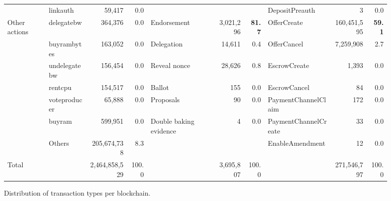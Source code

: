 \begin{figure*}[tbp]
\begin{tabular}{@{}lp{0.7in}rrp{1.2in}rrp{0.9in}rr@{}}
		                & linkauth                           & 59,417                             & 0.0                                 &                        &           &                            & DepositPreauth       & 3           & 0.0                        \\
		\cmidrule(r){1-1} \cmidrule(rl){2-4} \cmidrule(rl){5-7} \cmidrule(l){8-10}
		Other actions   & delegatebw                         & 364,376                            & 0.0                                 & Endorsement            & 3,021,296 & \textbf{             81.7} & OfferCreate          & 160,451,595 & \textbf{             59.1} \\
		                & buyrambytes                        & 163,052                            & 0.0                                 & Delegation             & 14,611    & 0.4                        & OfferCancel          & 7,259,908   & 2.7                        \\
		                & undelegatebw                       & 156,454                            & 0.0                                 & Reveal nonce           & 28,626    & 0.8                        & EscrowCreate         & 1,393       & 0.0                        \\
		                & rentcpu                            & 154,517                            & 0.0                                 & Ballot                 & 155       & 0.0                        & EscrowCancel         & 84          & 0.0                        \\
		                & voteproducer                       & 65,888                             & 0.0                                 & Proposals              & 90        & 0.0                        & PaymentChannelClaim  & 172         & 0.0                        \\
		                & buyram                             & 599,951                            & 0.0                                 & Double baking evidence & 4         & 0.0                        & PaymentChannelCreate & 33          & 0.0                        \\
		                & Others                             & 205,674,738                        & 8.3                                 &                        &           &                            & EnableAmendment      & 12          & 0.0                        \\
		\midrule
		\midrule
		Total           &                                    & 2,464,858,529                      & 100.0                               &                        & 3,695,807 & 100.0                      &                      & 271,546,797 & 100.0                      \\
		\bottomrule
	\end{tabular}
	\caption{Distribution of transaction types per blockchain.}
	\label{tab:transaction-types-distribution}%
\end{figure*}






